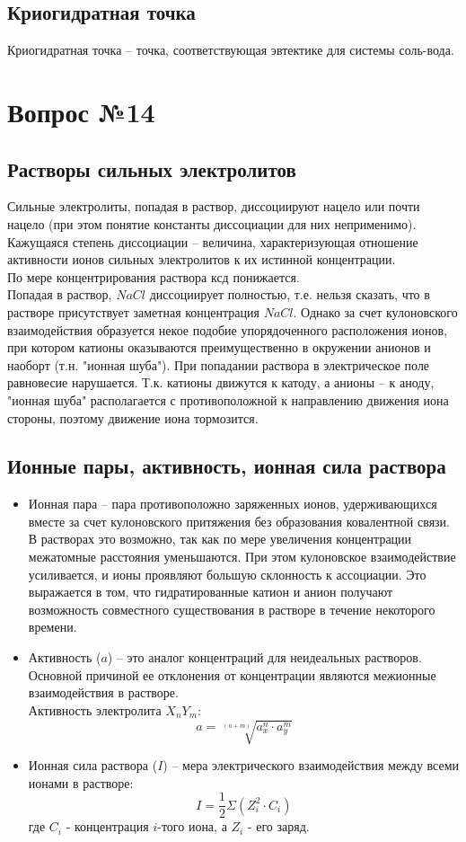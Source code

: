 \documentclass[14pt,a4paper]{scrartcl}
\begin{document}
\subsection*{Криогидратная точка}
Криогидратная точка -- точка, соответствующая эвтектике для системы соль-вода.

\section*{Вопрос №14}
\subsection*{Растворы сильных электролитов}
Сильные электролиты, попадая в раствор, диссоциируют нацело или почти нацело (при этом понятие константы диссоциации для них неприменимо). \\
Кажущаяся степень диссоциации -- величина, характеризующая отношение активности ионов сильных электролитов к их истинной концентрации. \\
По мере концентрирования раствора ксд понижается. \\
Попадая в раствор, $NaCl$ диссоциирует полностью, т.е. нельзя сказать, что в растворе присутствует заметная концентрация $NaCl$. Однако за счет кулоновского взаимодействия образуется некое подобие упорядоченного расположения ионов, при котором катионы оказываются преимущественно в окружении анионов и наоборт (т.н. "ионная шуба"). При попадании раствора в электрическое поле равновесие нарушается. Т.к. катионы движутся к катоду, а анионы -- к аноду, "ионная шуба" располагается с противоположной к направлению движения иона стороны, поэтому движение иона тормозится.
\subsection*{Ионные пары, активность, ионная сила раствора}
\begin{itemize}
	\item Ионная пара -- пара противоположно заряженных ионов, удерживающихся вместе за счет кулоновского притяжения без образования ковалентной связи. \\
	В растворах это возможно, так как по мере увеличения концентрации межатомные расстояния уменьшаются. При этом кулоновское взаимодействие усиливается, и ионы проявляют большую склонность к ассоциации. Это выражается в том, что гидратированные катион и анион получают возможность совместного существования в растворе в течение некоторого времени. \\
	\item Активность ($a$) -- это аналог концентраций для неидеальных растворов. Основной причиной ее отклонения от концентрации являются межионные взаимодействия в растворе. \\
	Активность электролита $X_nY_m$:	
	$$ a = \sqrt[(n+m)]{a_x^n \cdot a_y^m} $$
	\item Ионная сила раствора ($I$) -- мера электрического взаимодействия между всеми ионами в растворе:
	$$ I = \dfrac{1}{2} \Sigma(Z_i^2 \cdot C_i) $$
	где  $C_i $ - концентрация $i$-того иона, а $Z_i $ - его заряд.
\end{itemize}
\end{document}

